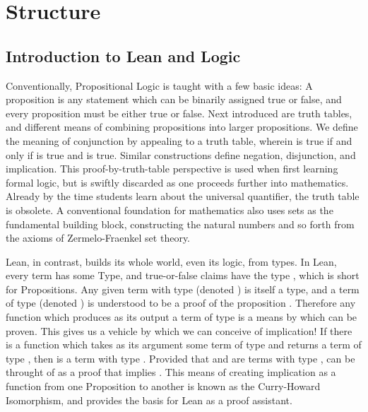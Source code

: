 

\chapter{Structure}

\section{Introduction to Lean and Logic}

Conventionally, Propositional Logic is taught with a few basic ideas:
A proposition is any statement which can be binarily assigned true or 
false, and every proposition must be either true or false. Next introduced 
are truth tables, and different means of combining propositions into 
larger propositions. We define the meaning of conjunction by appealing to 
a truth table, wherein  is true if and only if  is true 
and  is true. Similar constructions define negation, disjunction, 
and implication. This proof-by-truth-table perspective is used when
first learning formal logic, but is swiftly discarded as one proceeds
further into mathematics. Already by the time students learn 
about the universal quantifier, the truth table is obsolete.
A conventional foundation for mathematics also uses sets as the 
fundamental building block, constructing the natural numbers and so 
forth from the axioms of Zermelo-Fraenkel set theory.

Lean, in contrast, builds its whole world, even its logic, from types. 
In Lean, every term has some Type, and true-or-false claims have the type 
, which is short for Propositions. Any given term  with
type  (denoted ) is itself a type, and a term 
 of type  (denoted ) is understood to be a 
proof of the proposition . Therefore any function which produces as its
output a term of type  is a means by which  can be proven. This gives 
us a vehicle by which we can conceive of implication! If there is a function
 which takes as its argument some term  of type  and returns
a term of type , then  is a term with type . Provided that 
 and  are terms with type ,  can be throught of as a proof
that  implies . This means of creating implication as a function from
one Proposition to another is known as the Curry-Howard Isomorphism, and
provides the basis for Lean as a proof assistant. 

